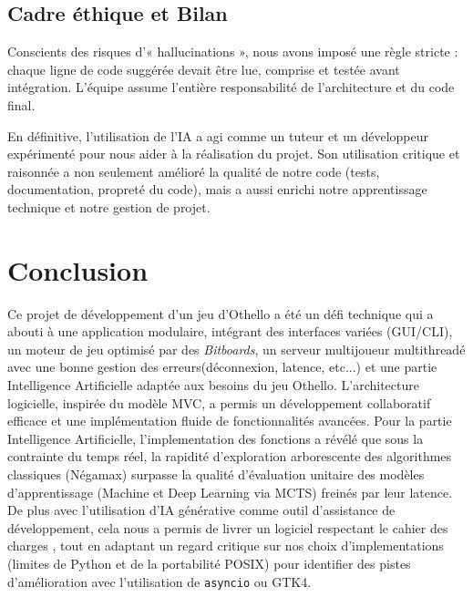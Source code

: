 \documentclass[a4paper]{article}
\begin{document}
\subsection{Cadre éthique et Bilan}
Conscients des risques d'« hallucinations », nous avons imposé une règle stricte : chaque ligne de code suggérée devait être lue, comprise et testée avant intégration. L'équipe assume l'entière responsabilité de l'architecture et du code final. 

En définitive, l'utilisation de l'IA a agi comme un tuteur et un développeur expérimenté pour nous aider à la réalisation du projet. Son utilisation critique et raisonnée a non seulement amélioré la qualité de notre code (tests, documentation, propreté du code), mais a aussi enrichi notre apprentissage technique et notre gestion de projet.


\section*{Conclusion}

Ce projet de développement d'un jeu d'Othello a été un défi technique qui a abouti à une application modulaire, intégrant des interfaces variées (GUI/CLI), 
un moteur de jeu optimisé par des \textit{Bitboards}, un serveur multijoueur multithreadé avec une bonne gestion des erreurs(déconnexion, latence, etc...) et une partie Intelligence Artificielle adaptée aux besoins du jeu Othello.
L'architecture logicielle, inspirée du modèle MVC, a permis un développement collaboratif efficace et une implémentation fluide de fonctionnalités avancées. 
Pour la partie Intelligence Artificielle, l'implementation des fonctions a révélé que sous la contrainte du temps réel, la rapidité d'exploration arborescente des algorithmes classiques (Négamax) 
surpasse la qualité d'évaluation unitaire des modèles d'apprentissage (Machine et Deep Learning via MCTS) freinés par leur latence. 
De plus avec l'utilisation d'IA générative comme outil d'assistance de développement, cela nous a permis de livrer un logiciel respectant le cahier des charges \cite{OthelloSpecs2025}, 
tout en adaptant un regard critique sur nos choix d'implementations (limites de Python et de la portabilité POSIX) pour identifier des pistes d'amélioration avec l'utilisation de \texttt{asyncio} ou GTK4.

\end{document}
